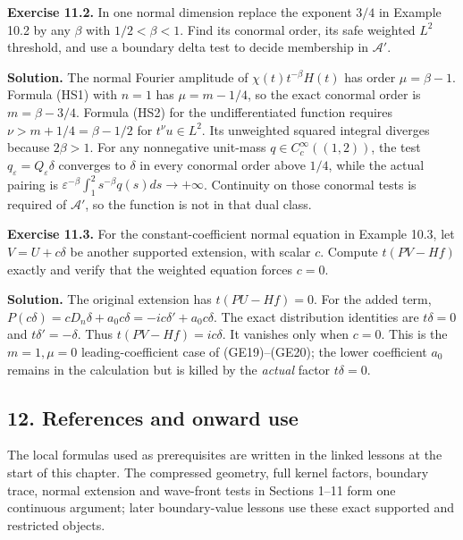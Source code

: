 \documentclass[
  11pt,
]{article}
\makeatletter
\let\ReaderOriginalAnchorStart\hyper@anchorstart
\let\ReaderOriginalAnchorEnd\hyper@anchorend
\let\ReaderPendingAliases\@empty
\def\ReaderArmAliases#1{\gdef\ReaderPendingAliases{#1}}
\def\hyper@anchorstart#1{\ReaderIfNativeAnchorTF{#1}{\ReaderPendingAliases\global\let\ReaderPendingAliases\@empty}{}\ReaderOriginalAnchorStart{#1}}
\makeatother
\begin{document}
\textbf{Exercise 11.2.} In one normal dimension replace the exponent
\(3/4\) in Example 10.2 by any \(\beta\) with \(1/2<\beta<1\). Find its
conormal order, its safe weighted \(L^2\) threshold, and use a boundary
delta test to decide membership in \(\mathcal A'\).

\textbf{Solution.} The normal Fourier amplitude of
\(\chi(t)t^{-\beta}H(t)\) has order \(\mu=\beta-1\). Formula (HS1) with
\(n=1\) has \(\mu=m-1/4\), so the exact conormal order is
\(m=\beta-3/4\). Formula (HS2) for the undifferentiated function
requires \(\nu>m+1/4=\beta-1/2\) for \(t^{\nu}u\in L^2\). Its unweighted
squared integral diverges because \(2\beta>1\). For any nonnegative
unit-mass \(q\in C_c^\infty((1,2))\), the test
\(q_\varepsilon=Q_\varepsilon\delta\) converges to \(\delta\) in every
conormal order above \(1/4\), while the actual pairing is
\(\varepsilon^{-\beta}\int_1^2s^{-\beta}q(s)ds\to+\infty\). Continuity
on those conormal tests is required of \(\mathcal A'\), so the function
is not in that dual class.

\textbf{Exercise 11.3.} For the constant-coefficient normal equation in
Example 10.3, let \(V=U+c\delta\) be another supported extension, with
scalar \(c\). Compute \(t(PV-Hf)\) exactly and verify that the weighted
equation forces \(c=0\).

\textbf{Solution.} The original extension has \(t(PU-Hf)=0\). For the
added term, \(P(c\delta)=cD_n\delta+a_0c\delta=-ic\delta'+a_0c\delta\).
The exact distribution identities are \(t\delta=0\) and
\(t\delta'=-\delta\). Thus \(t(PV-Hf)=ic\delta\). It vanishes only when
\(c=0\). This is the \(m=1,\mu=0\) leading-coefficient case of
(GE19)--(GE20); the lower coefficient \(a_0\) remains in the calculation
but is killed by the \emph{actual} factor \(t\delta=0\).

\ReaderArmAliases{\ReaderOriginalAnchorStart{AN03-GBD-012}\ReaderOriginalAnchorEnd\begingroup\expandafter\def\csname @currentHref\endcsname{AN03-GBD-012}\label{AN03-GBD-012}\endgroup\ReaderOriginalAnchorStart{12-references-and-onward-use}\ReaderOriginalAnchorEnd\begingroup\expandafter\def\csname @currentHref\endcsname{12-references-and-onward-use}\label{12-references-and-onward-use}\endgroup}
\subsection{12. References and onward
use}\label{references-and-onward-use}

The local formulas used as prerequisites are written in the linked
lessons at the start of this chapter. The compressed geometry, full
kernel factors, boundary trace, normal extension and wave-front tests in
Sections 1--11 form one continuous argument; later boundary-value
lessons use these exact supported and restricted objects.
\end{document}

